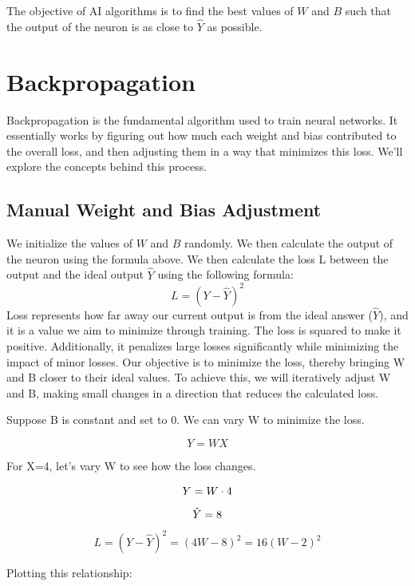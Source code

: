 \documentclass[12pt,a4paper]{article}
\begin{document}
The objective of AI algorithms is to find the best values of $W$ and $B$ such that the output of the neuron is as close to $\hat{Y}$ as possible.

\section{Backpropagation}
Backpropagation is the fundamental algorithm used to train neural networks. It essentially works by figuring out how much each weight and bias contributed to the overall loss, and then adjusting them in a way that minimizes this loss. We'll explore the concepts behind this process.

\subsection{Manual Weight and Bias Adjustment}
We initialize the values of $W$ and $B$ randomly. We then calculate the output of the neuron using the formula above. We then calculate the loss L between the output and the ideal output $\hat{Y}$ using the following formula:
\[
L =
(Y - \hat{Y})^2\]
Loss represents how far away our current output is from the ideal answer ($\hat{Y}$), and it is a value we aim to minimize through training.
The loss is squared to make it positive. Additionally, it penalizes large losses significantly while minimizing the impact of minor losses. Our objective is to minimize the loss, thereby bringing W and B closer to their ideal values.
To achieve this, we will iteratively adjust W and B, making small changes in a direction that reduces the calculated loss.

Suppose B is constant and set to 0. We can vary W to minimize the loss.

\[
Y=WX
\]

For X=4, let's vary W to see how the loss changes.

\[
Y = W \cdot 4 \\
\]
\[
\hat{Y} = 8 \\
\]
\[
L = (Y - \hat{Y})^2 = (4W - 8)^2 = 16(W-2)^2
\]

Plotting this relationship:

\begin{center}
\end{center}
\end{document}
